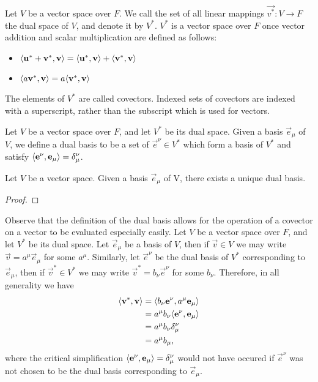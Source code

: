 \documentclass[../main.tex]{subfiles}
\begin{document}
    \begin{definition}
        Let \(V\) be a vector space over \(F\). We call the set of all linear mappings \(\vec{v^{*}}: V \to F\) the dual space of \(V\), and denote it by \(V^{*}\). \(V^{*}\) is a vector space over \(F\) once vector addition and scalar multiplication are defined as follows:
        \begin{itemize}
            \item \(\langle\mathbf{u}^{*}+\mathbf{v}^{*},\mathbf{v}\rangle = \langle\mathbf{u}^{*},\mathbf{v}\rangle+\langle\mathbf{v}^{*},\mathbf{v}\rangle\)
            \item \(\langle a\mathbf{v}^{*},\mathbf{v}\rangle = a\langle\mathbf{v}^{*},\mathbf{v}\rangle\)
        \end{itemize}
        The elements of \(V^{*}\) are called covectors. Indexed sets of covectors are indexed with a superscript, rather than the subscript which is used for vectors.
    \end{definition}

    \begin{definition}
        Let \(V\) be a vector space over \(F\), and let \(V^{*}\) be its dual space. Given a basis \(\vec{e}_{\mu}\) of \(V\), we define a dual basis to be a set of \(\vec{e}^{\nu} \in V^{*}\) which form a basis of \(V^{*}\) and satisfy \(\langle\mathbf{e}^{\nu},\mathbf{e}_{\mu}\rangle=\delta^{\nu}_{\mu}\).
    \end{definition}

    \begin{theorem}
        Let \(V\) be a vector space. Given a basis \(\vec{e}_{\mu}\) of V, there exists a unique dual basis.
        \begin{proof}
        \end{proof}
    \end{theorem}

    Observe that the definition of the dual basis allows for the operation of a covector on a vector to be evaluated especially easily. Let \(V\) be a vector space over \(F\), and let \(V^{*}\) be its dual space. Let \(\vec{e}_{\mu}\) be a basis of \(V\), then if \(\vec{v} \in V\) we may write \(\vec{v} = a^{\mu}\vec{e}_{\mu}\) for some \(a^{\mu}\). Similarly, let \(\vec{e}^{\nu}\) be the dual basis of \(V^{*}\) corresponding to \(\vec{e}_{\mu}\), then if \(\vec{v}^{*} \in V^{*}\) we may write \(\vec{v}^{*} = b_{\nu}\vec{e}^{\nu}\) for some \(b_{\nu}\). Therefore, in all generality we have
    \begin{align*}
        \langle\mathbf{v}^{*},\mathbf{v}\rangle &= \langle b_{\nu}\mathbf{e}^{\nu},a^{\mu}\mathbf{e}_{\mu}\rangle\\
                                   &= a^{\mu}b_{\nu}\langle\mathbf{e}^{\nu},\mathbf{e}_{\mu}\rangle\\
                                   &= a^{\mu}b_{\nu}\delta_{\mu}^{\nu}\\
                                   &= a^{\mu}b_{\mu},
    \end{align*}
    where the critical simplification \(\langle\mathbf{e}^{\nu},\mathbf{e}_{\mu}\rangle = \delta_{\mu}^{\nu}\) would not have occured if \(\vec{e}^{\nu}\) was not chosen to be the dual basis corresponding to \(\vec{e}_{\mu}\).
\end{document}
